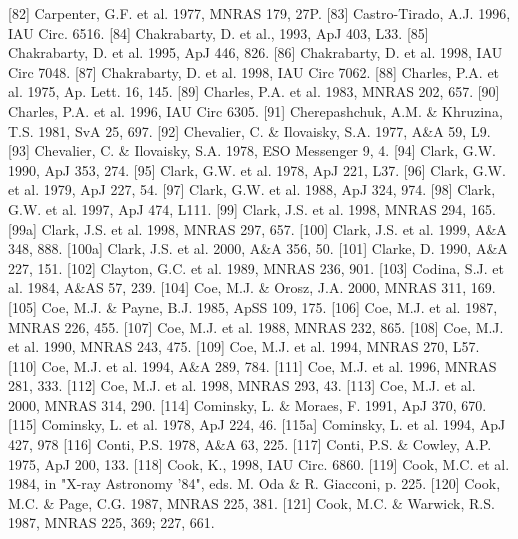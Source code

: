 \documentclass{aa}
\begin{document}
\begin{thebibliography}{}
\bibitem[]{}[82] Carpenter, G.F. et al. 1977, MNRAS 179, 27P.
\bibitem[]{}[83] Castro-Tirado, A.J. 1996, IAU Circ. 6516.
\bibitem[]{}[84] Chakrabarty, D. et al., 1993, ApJ 403, L33.
\bibitem[]{}[85] Chakrabarty, D. et al. 1995, ApJ 446, 826.
\bibitem[]{}[86] Chakrabarty, D. et al. 1998, IAU Circ 7048.
\bibitem[]{}[87] Chakrabarty, D. et al. 1998, IAU Circ 7062.
\bibitem[]{}[88] Charles, P.A. et al. 1975, Ap. Lett. 16, 145.
\bibitem[]{}[89] Charles, P.A. et al. 1983, MNRAS 202, 657.
\bibitem[]{}[90] Charles, P.A. et al. 1996, IAU Circ 6305.
\bibitem[]{}[91] Cherepashchuk, A.M. \& Khruzina, T.S. 1981, SvA 25, 697.
\bibitem[]{}[92] Chevalier, C. \& Ilovaisky, S.A. 1977, A\&A 59, L9.
\bibitem[]{}[93] Chevalier, C. \& Ilovaisky, S.A. 1978, ESO Messenger 9, 4.
\bibitem[]{}[94] Clark, G.W. 1990, ApJ 353, 274.
\bibitem[]{}[95] Clark, G.W. et al. 1978, ApJ 221, L37.
\bibitem[]{}[96] Clark, G.W. et al. 1979, ApJ 227, 54.
\bibitem[]{}[97] Clark, G.W. et al. 1988, ApJ 324, 974.
\bibitem[]{}[98] Clark, G.W. et al. 1997, ApJ 474, L111.
\bibitem[]{}[99] Clark, J.S. et al. 1998, MNRAS 294, 165.
\bibitem[]{}[99a] Clark, J.S. et al. 1998, MNRAS 297, 657.
\bibitem[]{}[100] Clark, J.S. et al. 1999, A\&A 348, 888.
\bibitem[]{}[100a] Clark, J.S. et al. 2000, A\&A 356, 50.
\bibitem[]{}[101] Clarke, D. 1990, A\&A 227, 151.
\bibitem[]{}[102] Clayton, G.C. et al. 1989, MNRAS 236, 901.
\bibitem[]{}[103] Codina, S.J. et al. 1984, A\&AS 57, 239.
\bibitem[]{}[104] Coe, M.J. \& Orosz, J.A. 2000, MNRAS 311, 169. 
\bibitem[]{}[105] Coe, M.J. \& Payne, B.J. 1985, ApSS 109, 175.
\bibitem[]{}[106] Coe, M.J. et al. 1987, MNRAS 226, 455.
\bibitem[]{}[107] Coe, M.J. et al. 1988, MNRAS 232, 865.
\bibitem[]{}[108] Coe, M.J. et al. 1990, MNRAS 243, 475.
\bibitem[]{}[109] Coe, M.J. et al. 1994, MNRAS 270, L57.
\bibitem[]{}[110] Coe, M.J. et al. 1994, A\&A 289, 784.
\bibitem[]{}[111] Coe, M.J. et al. 1996, MNRAS 281, 333.
\bibitem[]{}[112] Coe, M.J. et al. 1998, MNRAS 293, 43.
\bibitem[]{}[113] Coe, M.J. et al. 2000, MNRAS 314, 290.
\bibitem[]{}[114] Cominsky, L. \& Moraes, F. 1991, ApJ 370, 670.
\bibitem[]{}[115] Cominsky, L. et al. 1978, ApJ 224, 46.
\bibitem[]{}[115a] Cominsky, L. et al. 1994, ApJ 427, 978
\bibitem[]{}[116] Conti, P.S. 1978, A\&A 63, 225.
\bibitem[]{}[117] Conti, P.S. \& Cowley, A.P. 1975, ApJ 200, 133.
\bibitem[]{}[118] Cook, K., 1998, IAU Circ. 6860.
\bibitem[]{}[119] Cook, M.C. et al. 1984, in "X-ray Astronomy '84", eds. M. Oda \& R. Giacconi, p. 225.
\bibitem[]{}[120] Cook, M.C. \& Page, C.G. 1987, MNRAS 225, 381.
\bibitem[]{}[121] Cook, M.C. \& Warwick, R.S. 1987, MNRAS 225, 369; 227, 661.

\end{thebibliography}
\end{document}
